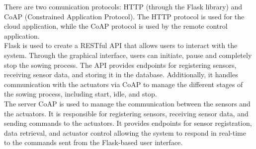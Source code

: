 There are two comunication protocols: HTTP (through the Flask library) and CoAP (Constrained Application Protocol). The HTTP protocol is used for the cloud application, while the CoAP protocol is used by the remote control application.\\
Flask is used to create a RESTful API that allows users to interact with the system. Through the graphical interface, users can initiate, pause and completely stop the sowing process. The API provides endpoints for registering sensors, receiving sensor data, and storing it in the database. Additionally, it handles communication with the actuators via CoAP to manage the different stages of the sowing process, including start, idle, and stop.\\

The server CoAP is used to manage the communication between the sensors and the actuators. It is responsible for registering sensors, receiving sensor data, and sending commands to the actuators. It provides endpoints for sensor registration, data retrieval, and actuator control allowing the system to respond in real-time to the commands sent from the Flask-based user interface.



